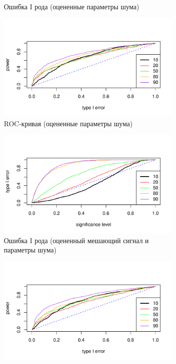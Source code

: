 \documentclass[specialist,
substylefile = spbu.rtx,
               subf,href,colorlinks=true,12pt]{disser}
\theoremstyle{definition}
\begin{document}
\begin{figure}[h!]
\begin{subfigure}[t]{0.5\textwidth}
		\caption{Ошибка I рода (оцененные параметры шума)}
		\label{fig:sin_est_noise_type1error}
	\end{subfigure}\hspace{\fill}
	\begin{subfigure}[t]{0.5\textwidth}
		\centering
		\includegraphics[width=\textwidth]{img/roc_sin_est_noise.pdf}
		\caption{ROC-кривая (оцененные параметры шума)}
		\label{fig:sin_est_noise_roc}
	\end{subfigure}
	\begin{subfigure}[t]{0.5\textwidth}
		\centering
		\includegraphics[width=\textwidth]{img/type1error_sin_est_noise_signal.pdf}
		\caption{Ошибка I рода (оцененный мешающий сигнал и параметры шума)}
		\label{fig:sin_est_noise_signal_type1error}
	\end{subfigure}\hspace{\fill}
	\begin{subfigure}[t]{0.5\textwidth}
		\centering
		\includegraphics[width=\textwidth]{img/roc_sin_est_noise_signal.pdf}

\end{subfigure}
\end{figure}
\end{document}

